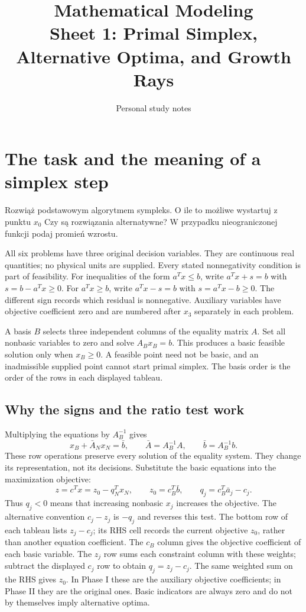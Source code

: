 \documentclass[11pt,a4paper]{article}
\title{\textbf{Mathematical Modeling}\\[2mm]
\large Sheet 1: Primal Simplex, Alternative Optima, and Growth Rays}
\author{Personal study notes}
\date{}
\begin{document}
\maketitle
{\small\tableofcontents}

\section{The task and the meaning of a simplex step}\label{sec:task}
\begin{otherlanguage}{polish}
  Rozwiąż podstawowym algorytmem sympleks. O ile to możliwe wystartuj z punktu
  $x_0$ Czy są rozwiązania alternatywne? W przypadku nieograniczonej funkcji
  podaj promień wzrostu.
\end{otherlanguage}
All six problems have three original decision variables. They are continuous
real quantities; no physical units are supplied. Every stated nonnegativity
condition is part of feasibility. For inequalities of the form $a^Tx\leq b$,
write $a^Tx+s=b$ with $s=b-a^Tx\geq0$. For $a^Tx\geq b$, write
$a^Tx-s=b$ with $s=a^Tx-b\geq0$. The different sign records which residual
is nonnegative. Auxiliary variables have objective coefficient zero and are
numbered after $x_3$ separately in each problem.

A basis $B$ selects three independent columns of the equality matrix $A$.
Set all nonbasic variables to zero and solve $A_Bx_B=b$. This produces a
basic feasible solution only when $x_B\geq0$. A feasible point need not be
basic, and an inadmissible supplied point cannot start primal simplex.
The basis order is the order of the rows in each displayed tableau.

\subsection{Why the signs and the ratio test work}\label{sec:step}
Multiplying the equations by $A_B^{-1}$ gives
\[
  x_B+\bar A_Nx_N=\bar b,\qquad
  \bar A=A_B^{-1}A,\qquad\bar b=A_B^{-1}b.
\]
These row operations preserve every solution of the equality system. They
change its representation, not its decisions. Substitute the basic equations
into the maximization objective:
\[
  z=c^Tx=z_0-q_N^Tx_N,\qquad
  z_0=c_B^T\bar b,\qquad q_j=c_B^T\bar a_j-c_j.
\]
Thus $q_j<0$ means that increasing nonbasic $x_j$ increases the objective.
The alternative convention $c_j-z_j$ is $-q_j$ and reverses this test.
The bottom row of each tableau lists $z_j-c_j$; its RHS cell records the current
objective $z_0$, rather than another equation coefficient. The $c_B$ column gives the objective coefficient of each basic
variable. The $z_j$ row sums each constraint column with these weights;
subtract the displayed $c_j$ row to obtain $q_j=z_j-c_j$. The same
weighted sum on the RHS gives $z_0$. In Phase I these are the auxiliary
objective coefficients; in Phase II they are the original ones. Basic indicators
are always zero and do not by themselves imply alternative optima.
\end{document}

